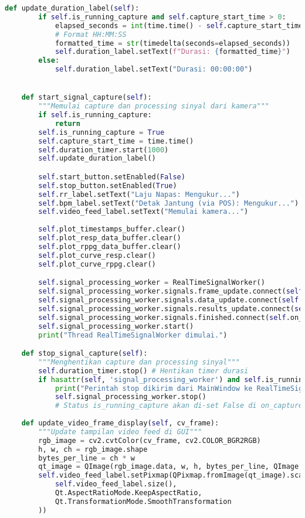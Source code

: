 \documentclass[11pt,a4paper]{article}
\begin{document}
\begin{lstlisting}[language=Python, caption=Kelas RealTimeSignalWorker,label={labelkode}]
    def update_duration_label(self):
        if self.is_running_capture and self.capture_start_time > 0:
            elapsed_seconds = int(time.time() - self.capture_start_time)
            # Format HH:MM:SS
            formatted_time = str(timedelta(seconds=elapsed_seconds))
            self.duration_label.setText(f"Durasi: {formatted_time}")
        else:
            self.duration_label.setText("Durasi: 00:00:00")


    def start_signal_capture(self):
        """Memulai capture dan processing sinyal dari kamera"""
        if self.is_running_capture:
            return
        self.is_running_capture = True
        self.capture_start_time = time.time() 
        self.duration_timer.start(1000) 
        self.update_duration_label() 

        self.start_button.setEnabled(False)
        self.stop_button.setEnabled(True)
        self.rr_label.setText("Laju Napas: Mengukur...")
        self.bpm_label.setText("Detak Jantung (via POS): Mengukur...")
        self.video_feed_label.setText("Memulai kamera...")
        
        self.plot_timestamps_buffer.clear()
        self.plot_resp_data_buffer.clear()
        self.plot_rppg_data_buffer.clear()
        self.plot_curve_resp.clear() 
        self.plot_curve_rppg.clear()

        self.signal_processing_worker = RealTimeSignalWorker()
        self.signal_processing_worker.signals.frame_update.connect(self.update_video_frame_display)
        self.signal_processing_worker.signals.data_update.connect(self.update_live_plots)
        self.signal_processing_worker.signals.results_update.connect(self.update_rr_bpm_results)
        self.signal_processing_worker.signals.finished.connect(self.on_capture_finished_save_results)
        self.signal_processing_worker.start()
        print("Thread RealTimeSignalWorker dimulai.")

    def stop_signal_capture(self):
        """Menghentikan capture dan processing sinyal"""
        self.duration_timer.stop() # Hentikan timer durasi
        if hasattr(self, 'signal_processing_worker') and self.is_running_capture:
            print("Perintah stop dikirim dari MainWindow ke RealTimeSignalWorker.")
            self.signal_processing_worker.stop()
            # Status is_running_capture akan di-set False di on_capture_finished_save_results
            
    def update_video_frame_display(self, cv_frame):
        """Update tampilan video feed di GUI"""
        rgb_image = cv2.cvtColor(cv_frame, cv2.COLOR_BGR2RGB)
        h, w, ch = rgb_image.shape
        bytes_per_line = ch * w
        qt_image = QImage(rgb_image.data, w, h, bytes_per_line, QImage.Format.Format_RGB888)
        self.video_feed_label.setPixmap(QPixmap.fromImage(qt_image).scaled(
            self.video_feed_label.size(), 
            Qt.AspectRatioMode.KeepAspectRatio, 
            Qt.TransformationMode.SmoothTransformation
        ))


\end{lstlisting}
\end{document}
